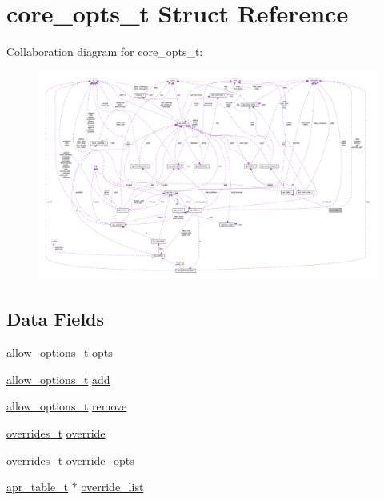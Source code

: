 \hypertarget{structcore__opts__t}{}\section{core\+\_\+opts\+\_\+t Struct Reference}
\label{structcore__opts__t}


Collaboration diagram for core\+\_\+opts\+\_\+t\+:
\nopagebreak
\begin{figure}[H]
\begin{center}
\leavevmode
\includegraphics[width=350pt]{structcore__opts__t__coll__graph}
\end{center}
\end{figure}
\subsection*{Data Fields}
\begin{DoxyCompactItemize}
\item 
\hyperlink{group__APACHE__CORE__HTTPD_ga690d446d4d1bb68e9b9ad82e1de6faa2}{allow\+\_\+options\+\_\+t} \hyperlink{structcore__opts__t_af42a08d6a4460926e92418171f811fb1}{opts}
\item 
\hyperlink{group__APACHE__CORE__HTTPD_ga690d446d4d1bb68e9b9ad82e1de6faa2}{allow\+\_\+options\+\_\+t} \hyperlink{structcore__opts__t_acc3194d49072c71834aef42810d1761e}{add}
\item 
\hyperlink{group__APACHE__CORE__HTTPD_ga690d446d4d1bb68e9b9ad82e1de6faa2}{allow\+\_\+options\+\_\+t} \hyperlink{structcore__opts__t_a52f40c88c047ebe55bce4519e79e478c}{remove}
\item 
\hyperlink{group__APACHE__CORE__HTTPD_ga4c9d0f694a232ecee18b53bfe18a8ce6}{overrides\+\_\+t} \hyperlink{structcore__opts__t_a58a3a2ce9f7c4f585e5ee93fceed59ef}{override}
\item 
\hyperlink{group__APACHE__CORE__HTTPD_ga4c9d0f694a232ecee18b53bfe18a8ce6}{overrides\+\_\+t} \hyperlink{structcore__opts__t_ae88ae92abb0c6f19be537d97dbda1e56}{override\+\_\+opts}
\item 
\hyperlink{structapr__table__t}{apr\+\_\+table\+\_\+t} $\ast$ \hyperlink{structcore__opts__t_a39d196d383847cbfc33dc004e6e0f28d}{override\+\_\+list}
\end{DoxyCompactItemize}


